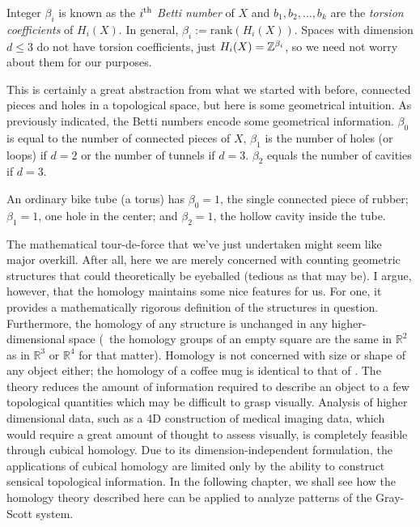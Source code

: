 Integer $\beta_i$ is known as the $i\textsuperscript{th}$ \textit{Betti number} of $X$ and $b_1, b_2, \ldots, b_k$ are the \textit{torsion coefficients} of $H_i(X)$. In general, $\beta_i := \text{rank}( H_i( X ) )$. Spaces with dimension $d \leq 3$ do not have torsion coefficients, just $H_i(X) = \mathbb{Z}^{\beta_i}$, so we need not worry about them for our purposes.

This is certainly a great abstraction from what we started with before, connected pieces and holes in a topological space, but here is some geometrical intuition. As previously indicated, the Betti numbers encode some geometrical information. $\beta_0$ is equal to the number of connected pieces of $X$, $\beta_1$ is the number of holes (or loops) if $d = 2$ or the number of tunnels if $d = 3$. $\beta_2$ equals the number of cavities if $d=3$.

\begin{exmp}
	An ordinary bike tube (a torus) has $\beta_0 = 1$, the single connected piece of rubber; $\beta_1 = 1$, one hole in the center; and $\beta_2 = 1$, the hollow cavity inside the tube.
\end{exmp}

The mathematical tour-de-force that we've just undertaken might seem like major overkill. After all, here we are merely concerned with counting geometric structures that could theoretically be eyeballed (tedious as that may be). I argue, however, that the homology maintains some nice features for us. For one, it provides a mathematically rigorous definition of the structures in question. Furthermore, the homology of any structure is unchanged in any higher-dimensional space (\eg~the homology groups of an empty square are the same in $\mathbb{R}^2$ as in $\mathbb{R}^3$ or $\mathbb{R}^4$ for that matter). Homology is not concerned with size or shape of any object either; the homology of a coffee mug is identical to that of . The theory reduces the amount of information required to describe an object to a few topological quantities which may be difficult to grasp visually. Analysis of higher dimensional data, such as a 4D construction of medical imaging data, which would require a great amount of thought to assess visually, is completely feasible through cubical homology. Due to its dimension-independent formulation, the applications of cubical homology are limited only by the ability to construct sensical topological information. In the following chapter, we shall see how the homology theory described here can be applied to analyze patterns of the Gray-Scott system.


